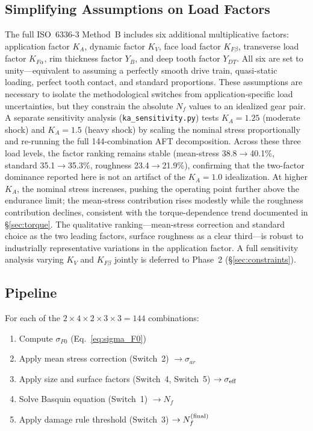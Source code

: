 \documentclass[12pt,a4paper]{article}
\begin{document}
\subsection{Simplifying Assumptions on Load Factors}
\label{sec:load_factors}

The full ISO~6336-3 Method~B includes six additional multiplicative
factors: application factor $K_A$, dynamic factor $K_V$, face load
factor $K_{F\beta}$, transverse load factor $K_{F\alpha}$, rim
thickness factor $Y_B$, and deep tooth factor $Y_{DT}$. All six are set
to unity---equivalent to assuming a perfectly smooth drive train,
quasi-static loading, perfect tooth contact, and standard proportions.
These assumptions are necessary to isolate the methodological switches
from application-specific load uncertainties, but they constrain the
absolute $N_f$ values to an idealized gear pair. A separate sensitivity
analysis (\texttt{ka\_sensitivity.py}) tests $K_A = 1.25$ (moderate
shock) and $K_A = 1.5$ (heavy shock) by scaling the nominal stress
proportionally and re-running the full 144-combination AFT
decomposition. Across these three load levels, the factor ranking
remains stable (mean-stress 38.8$\rightarrow$40.1\%, standard
35.1$\rightarrow$35.3\%, roughness 23.4$\rightarrow$21.9\%), confirming that
the two-factor dominance reported here is not an artifact of the
$K_A=1.0$ idealization. At higher $K_A$, the nominal stress increases,
pushing the operating point further above the endurance limit; the
mean-stress contribution rises modestly while the roughness
contribution declines, consistent with the torque-dependence trend
documented in \S\ref{sec:torque}. The qualitative ranking---mean-stress
correction and standard choice as the two leading factors, surface
roughness as a clear third---is robust to industrially representative
variations in the application factor. A full sensitivity analysis
varying $K_V$ and $K_{F\beta}$ jointly is deferred to Phase~2
(\S\ref{sec:constraints}).

\subsection{Pipeline}

For each of the $2\times4\times2\times3\times3 = 144$ combinations:
\begin{enumerate}
  \item Compute $\sigma_{F0}$ (Eq.~\ref{eq:sigma_F0})
  \item Apply mean stress correction (Switch~2) $\rightarrow \sigma_{ar}$
  \item Apply size and surface factors (Switch~4, Switch~5)
        $\rightarrow \sigma_{\rm eff}$
  \item Solve Basquin equation (Switch~1) $\rightarrow N_f$
  \item Apply damage rule threshold (Switch~3)
        $\rightarrow N_f^{\rm (final)}$
\end{enumerate}
\end{document}
